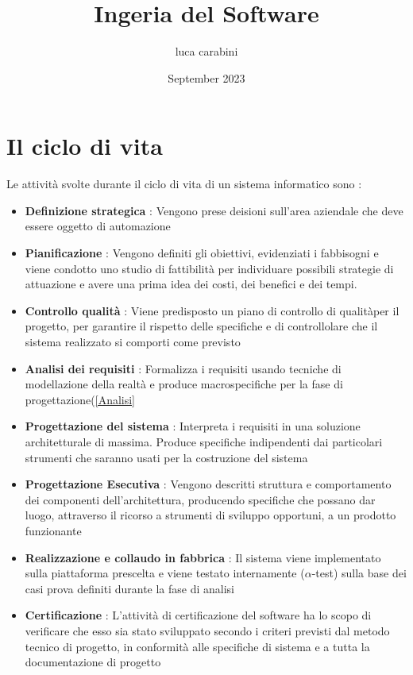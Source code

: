 \documentclass{report}
\title{Ingeria del Software}
\author{luca carabini}
\date{September 2023}
\begin{document}
\maketitle
\tableofcontents
\chapter{Il ciclo di vita}
    Le attività svolte durante il ciclo di vita di un sistema informatico sono :
    \begin{itemize}
        \item \textbf{Definizione strategica} : Vengono prese deisioni sull'area aziendale che deve essere oggetto di automazione
        \item \textbf{Pianificazione} : Vengono definiti gli obiettivi, evidenziati i fabbisogni e viene condotto uno studio di fattibilità per individuare possibili strategie di attuazione e avere una prima idea dei costi, dei benefici e dei tempi. 
        \item \textbf{Controllo qualità} : Viene predisposto un piano di controllo di qualitàper il progetto, per garantire il rispetto delle specifiche e di controllolare che il sistema realizzato si comporti come previsto
        \item \textbf{Analisi dei requisiti} : Formalizza i requisiti usando tecniche di modellazione della realtà e produce macrospecifiche per la fase di progettazione(\ref{Analisi}
        \item \textbf{Progettazione del sistema} : Interpreta i requisiti in una soluzione architetturale di massima. Produce specifiche indipendenti dai particolari strumenti che saranno usati per la costruzione del sistema
        \item \textbf{Progettazione Esecutiva} : Vengono descritti struttura e comportamento dei componenti dell'architettura, producendo specifiche che possano dar luogo, attraverso il ricorso a strumenti di sviluppo opportuni, a un prodotto funzionante
        \item \textbf{Realizzazione e collaudo in fabbrica} : Il sistema viene implementato sulla piattaforma prescelta e viene testato internamente ($\alpha$-test) sulla base dei casi prova definiti durante la fase di analisi
        \item \textbf{Certificazione} : L'attività di certificazione del software ha lo scopo di verificare che esso sia stato sviluppato secondo i criteri previsti dal metodo tecnico di progetto, in conformità alle specifiche di sistema e a tutta la documentazione di progetto 

\end{itemize}
\end{document}
